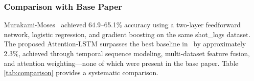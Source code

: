 \documentclass[conference]{IEEEtran}
\begin{document}
\subsubsection{Comparison with Base Paper}
Murakami-Moses~\cite{b1} achieved 64.9--65.1\% accuracy using a
two-layer feedforward network, logistic regression, and gradient boosting
on the same shot\_logs dataset.  The proposed Attention-LSTM surpasses
the best baseline in~\cite{b1} by approximately 2.3\%, achieved through
temporal sequence modeling, multi-dataset feature fusion, and attention
weighting—none of which were present in the base paper.
Table\,\ref{tab:comparison} provides a systematic comparison.

\begin{table}[htbp]
\centering
\caption{Comparison with Base Paper}
\label{tab:comparison}
\renewcommand{\arraystretch}{1.4}
\setlength{\tabcolsep}{2pt}
\scriptsize
{}
\vspace{0.1cm}
\end{table}
\end{document}
